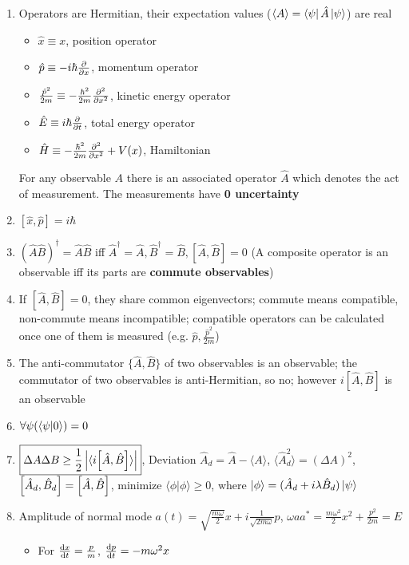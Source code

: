 \documentclass{article}
\theoremstyle{remark}
\theoremstyle{remark}
\begin{document}
\begin{enumerate}
\begin{itemize}
    \end{itemize}
    \item Operators are Hermitian, their expectation values ($\langle A\rangle=\bra{\psi}\hat{A}\ket{\psi}$) are real\begin{itemize}
        \item $\hat{x}\equiv x$, position operator
        \item $\hat{p}\equiv -i\hbar\pdv{x}$, momentum operator
        \item $\frac{\hat{p}^2}{2m}\equiv-\frac{\hbar^2}{2m}\pdv[2]{x}$, kinetic energy operator
        \item $\hat{E}\equiv i\hbar\pdv{t}$, total energy operator
        \item $\hat{H}\equiv-\frac{\hbar^2}{2m}\pdv[2]{x}+V(x)$, Hamiltonian
    \end{itemize}
    For any observable $A$ there is an associated operator $\hat{A}$ which denotes the act of measurement. The measurements have \textbf{0 uncertainty}
    \item $[\hat{x},\hat{p}]=i\hbar$
    \item $(\hat{A}\hat{B})^\dagger=\hat{A}\hat{B}$ iff $\hat{A}^\dagger=\hat{A},\hat{B}^\dagger=\hat{B},[\hat{A},\hat{B}]=0$ (A composite operator is an observable iff its parts are \textbf{commute observables})
    \item If $[\hat{A},\hat{B}]=0$, they share common eigenvectors; commute means compatible, non-commute means incompatible; compatible operators can be calculated once one of them is measured (e.g. $\hat{p},\frac{\hat{p}^2}{2m}$)
    \item The anti-commutator $\{\hat{A},\hat{B}\}$ of two observables is an observable; the commutator of two observables is anti-Hermitian, so no; however $i[\hat{A},\hat{B}]$ is an observable
    \item $\forall\psi(\bra{\psi}\ket{0})=0$
    \item $\boxed{\Delta A\Delta B\geq\frac{1}{2}\left|\langle i\comm{\hat{A}}{\hat{B}}\rangle\right|}$, Deviation $\hat{A}_d=\hat{A}-\langle A\rangle$, $\langle \hat{A}_d^2\rangle=(\Delta A)^2$, $\comm{\hat{A}_d}{\hat{B}_d}=\comm{\hat{A}}{\hat{B}}$, minimize $\langle\phi|\phi\rangle\geq0$, where $\ket{\phi}=(\hat{A}_d+i\lambda\hat{B}_d)\ket{\psi}$
    \item Amplitude of normal mode $a(t)=\sqrt{\frac{m\omega}{2}}x+i\frac{1}{\sqrt{2m\omega}}p$, $\omega aa^*=\frac{m\omega^2}{2}x^2+\frac{p^2}{2m}=E$\begin{itemize}
        \item For $\dv{x}{t}=\frac{p}{m}$, $\dv{p}{t}=-m\omega^2 x$

\end{itemize}
\end{enumerate}
\end{document}
